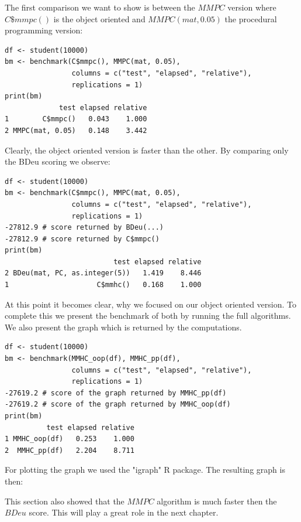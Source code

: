 		The first comparison we want to show is between the $MMPC$ version where $C\$mmpc()$ is the object oriented and $MMPC(mat, 0.05)$ the procedural programming version:

		\begin{verbatim}
df <- student(10000)
bm <- benchmark(C$mmpc(), MMPC(mat, 0.05),
                columns = c("test", "elapsed", "relative"),
                replications = 1)
print(bm)
             test elapsed relative
1        C$mmpc()   0.043    1.000
2 MMPC(mat, 0.05)   0.148    3.442
		\end{verbatim}

		Clearly, the object oriented version is faster than the other. By comparing only the BDeu scoring we observe:

		\begin{verbatim}
df <- student(10000)
bm <- benchmark(C$mmpc(), MMPC(mat, 0.05),
                columns = c("test", "elapsed", "relative"),
                replications = 1)
-27812.9 # score returned by BDeu(...)
-27812.9 # score returned by C$mmpc()
print(bm)
                          test elapsed relative
2 BDeu(mat, PC, as.integer(5))   1.419    8.446
1                     C$mmhc()   0.168    1.000
		\end{verbatim}

		At this point it becomes clear, why we focused on our object oriented version. To complete this we present the benchmark of both by running the full algorithms. We also present the graph which is returned by the computations.

		\begin{verbatim}
df <- student(10000)
bm <- benchmark(MMHC_oop(df), MMHC_pp(df),
                columns = c("test", "elapsed", "relative"),
                replications = 1)
-27619.2 # score of the graph returned by MMHC_pp(df)
-27619.2 # score of the graph returned by MMHC_oop(df)
print(bm)
          test elapsed relative
1 MMHC_oop(df)   0.253    1.000
2  MMHC_pp(df)   2.204    8.711
		\end{verbatim}

		For plotting the graph we used the "igraph" R package. The resulting graph is then:

		 \label{img.resultingGraph}

		This section also showed that the $MMPC$ algorithm is much faster then the $BDeu$ score. This will play a great role in the next chapter.



